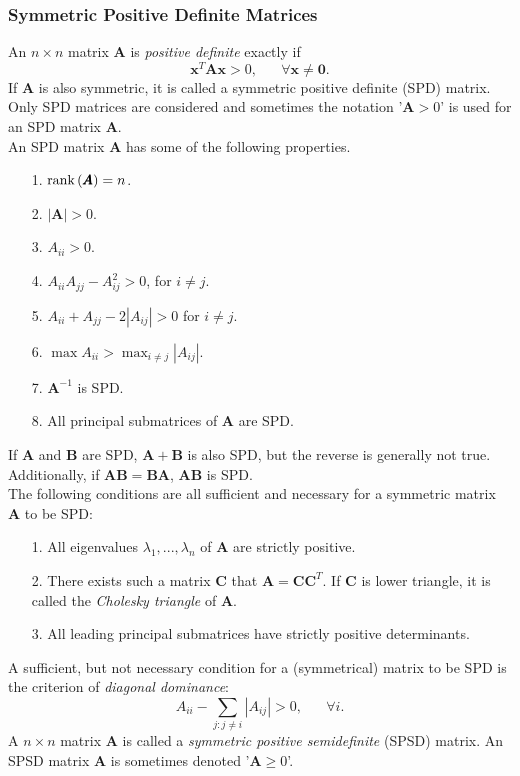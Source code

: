 \subsubsection*{Symmetric Positive Definite Matrices}
An $n \times n$ matrix $\pmb{A}$ is \textit{positive definite} exactly if
\begin{equation*}
    \pmb{x}^T\pmb{A}\pmb{x}>0,\hspace{20pt}\forall\pmb{x}\neq\pmb{0}.
\end{equation*}
If $\pmb{A}$ is also symmetric, it is called a symmetric positive definite (SPD) matrix. Only SPD matrices are considered and sometimes the notation '$\pmb{A}>0$' is used for an SPD matrix $\pmb{A}$. \\
An SPD matrix $\pmb{A}$ has some of the following properties.
\begin{itemize}
    \item[1.] $\hbox{rank}\left(\pmb{A}\right)=n$.
    \item[2.] $|\pmb{A}|>0$.
    \item[3.] $A_{ii}>0$.
    \item[4.] $A_{ii}A_{jj}-A_{ij}^2>0$, for $i\neq j$.
    \item[5.] $A_{ii} + A_{jj}-2|A_{ij}|>0$ for $i\neq j$.
    \item[6.] $\max A_{ii}>\max_{i\neq j}|A_{ij}|$.
    \item[7.] $\pmb{A}^{-1}$ is SPD.
    \item[8.] All principal submatrices of $\pmb{A}$ are SPD.
\end{itemize}
If $\pmb{A}$ and $\pmb{B}$ are SPD, $\pmb{A}+\pmb{B}$ is also SPD, but the reverse is generally not true. Additionally, if $\pmb{AB}=\pmb{BA}$, $\pmb{AB}$ is SPD. \\
The following conditions are all sufficient and necessary for a symmetric matrix $\pmb{A}$ to be SPD:
\begin{itemize}
    \item[1.] All eigenvalues $\lambda_1,...,\lambda_n$ of $\pmb{A}$ are strictly positive.
    \item[2.] There exists such a matrix $\pmb{C}$ that $\pmb{A}=\pmb{CC}^T$. If $\pmb{C}$ is lower triangle, it is called the \textit{Cholesky triangle} of $\pmb{A}$.
    \item[3.] All leading principal submatrices have strictly positive determinants.
\end{itemize}    
A sufficient, but not necessary condition for a (symmetrical) matrix to be SPD is the criterion of \textit{diagonal dominance}:
    \begin{equation*}
        A_{ii}-\sum_{j:j\neq i}|A_{ij}|>0,\hspace{20pt}\forall i.
    \end{equation*}
    A $n\times n$ matrix $\pmb{A}$ is called a \textit{symmetric positive semidefinite} (SPSD) matrix. An SPSD matrix $\pmb{A}$ is sometimes denoted '$\pmb{A}\geq0$'\autocite[Cf.][]{rue2005gaussian}.
\clearpage

